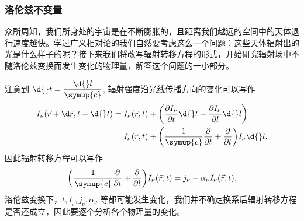 \documentclass[../天体物理基础.tex]{subfiles}
\begin{document}
\subsubsection{洛伦兹不变量}
众所周知，我们所身处的宇宙是在不断膨胀的，且距离我们越远的空间中的天体退行速度越快。学过广义相对论的我们自然要考虑这么一个问题：这些天体辐射出的光是什么样子的呢？接下来我们将改写辐射转移方程的形式，开始研究辐射场中不随洛伦兹变换而发生变化的物理量，解答这个问题的一小部分。

注意到 $\d{}t=\dfrac{\d{}l}{\symup{c}}$, 辐射强度沿光线传播方向的变化可以写作
\begin{align}
I_{\nu}\mleft(\vec{r}+\d\vec{r}, t+\d{}t\mright)&=I_{\nu}\mleft(\vec{r}, t\mright)+\mleft(\frac{\partial I_{\nu}}{\partial t}\d{}t+\frac{\partial I_{\nu}}{\partial l}\d{}l\mright)\notag\\
&=I_{\nu}\mleft(\vec{r}, t\mright)+\mleft(\frac{1}{\symup{c}}\frac{\partial}{\partial t}+\frac{\partial}{\partial l}\mright) I_{\nu}\d{}l.
\end{align}
因此辐射转移方程可以写作
\begin{equation}
\mleft(\frac{1}{\symup{c}}\frac{\partial}{\partial t}+\frac{\partial}{\partial l}\mright) I_{\nu}\mleft(\vec{r}, t\mright)=j_{\nu}-\alpha_{\nu}I_{\nu}\mleft(\vec{r}, t\mright).\label{1.1.51}
\end{equation}
洛伦兹变换下，$t, I_{_{\nu}}, j_{\nu},\alpha_{\nu}$ 等都可能发生变化，我们并不确定换系后辐射转移方程是否还成立，因此要逐个分析各个物理量的变化。
\end{document}
